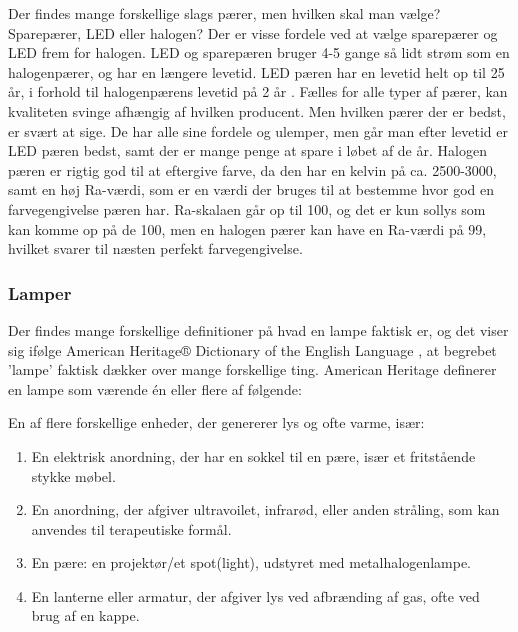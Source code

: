 Der findes mange forskellige slags pærer, men hvilken skal man vælge? Sparepærer, LED eller halogen?
Der er visse fordele ved at vælge sparepærer og LED frem for halogen. LED og sparepæren bruger 4-5 gange så lidt strøm som en halogenpærer, og har en længere levetid. LED pæren \cite{LED} har en levetid helt op til 25 år, i forhold til halogenpærens levetid på 2 år \cite{vaelg_paere}.
Fælles for alle typer af pærer, kan kvaliteten svinge afhængig af hvilken producent. Men hvilken pærer der er bedst, er svært at sige. De har alle sine fordele og ulemper, men går man efter levetid er LED pæren bedst, samt der er mange penge at spare i løbet af de år. Halogen pæren er rigtig god til at eftergive farve, da den har en kelvin på ca. 2500-3000, samt en høj Ra-værdi, som er en værdi der bruges til at bestemme hvor god en farvegengivelse pæren har. 
Ra-skalaen går op til 100, og det er kun sollys som kan komme op på de 100, men en halogen pærer \cite{halogen_paere} kan have en Ra-værdi på 99, hvilket svarer til næsten perfekt farvegengivelse. 

\subsubsection{Lamper}
Der findes mange forskellige definitioner på hvad en lampe faktisk er, og det viser sig ifølge American Heritage® Dictionary of the English Language \cite{american_heritage}, at begrebet ’lampe’ faktisk dækker over mange forskellige ting. American Heritage definerer en lampe som værende én eller flere af følgende:

En af flere forskellige enheder, der genererer lys og ofte varme, især:
\begin{enumerate}
    \item En elektrisk anordning, der har en sokkel til en pære, især et fritstående stykke møbel.
    \item En anordning, der afgiver ultravoilet, infrarød, eller anden stråling, som kan anvendes til terapeutiske formål.
    \item En pære: en projektør/et spot(light), udstyret med metalhalogenlampe.
    \item En lanterne eller armatur, der afgiver lys ved afbrænding af gas, ofte ved brug af en kappe.
\end{enumerate}

